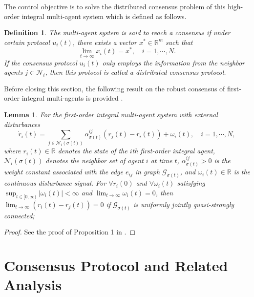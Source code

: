 \documentclass[12pt,draftcls,onecolumn]{IEEEtran}
\newtheorem{lem}{Lemma}
\newtheorem{Def}{Definition}
\begin{document}
The control objective is to solve the distributed consensus problem of this high-order integral multi-agent system which is defined as follows.
\begin{Def}\label{def1}
The multi-agent system is said to reach a consensus if under certain protocol $u_i(t)$, there exists a vector $x^*\in \mathbb{R}^m$ such that
\begin{displaymath}
\lim_{t\to\infty}x_i(t) = x^*,\quad i=1,\cdots,N.
\end{displaymath}
If the consensus protocol $u_i(t)$ only employs the information from the neighbor agents $j \in \mathcal{N}_i$, then this protocol is called a distributed consensus protocol.
\end{Def}

Before closing this section, the following result on the robust consensus of first-order integral multi-agents is provided \cite{Shi12arXiv}.
\begin{lem}\label{keylem}
For the first-order integral multi-agent system with external disturbances
\begin{equation}\label{equ:firstorder}
\dot{r}_i(t) = \sum_{j\in \mathcal{N}_i(\sigma(t))}\alpha^{ij}_{\sigma(t)}(r_j(t) - r_i(t)) + \omega_i(t), \quad i=1,\cdots,N,
\end{equation}
where $r_i(t) \in \mathbb{R}$ denotes the state of the $i$th first-order integral agent, $\mathcal{N}_i(\sigma(t))$ denotes the neighbor set of agent $i$ at time $t$, $\alpha^{ij}_{\sigma(t)} > 0$ is the weight constant associated with the edge $e_{ij}$ in graph $\mathcal{G}_{\sigma(t)}$, and $\omega_i(t) \in \mathbb{R}$ is the continuous disturbance signal. For $\forall r_i(0)$ and $\forall \omega_i(t)$ satisfying $\sup_{t\in[0,\infty)}|\omega_i(t)| < \infty$ and $\lim_{t\to\infty}\omega_i(t) = 0$, then $\lim_{t\to\infty} (r_i(t)-r_j(t)) = 0$ if $\mathcal{G}_{\sigma(t)}$ is uniformly jointly quasi-strongly connected;
\end{lem}
\begin{proof}
 See the proof of Proposition 1 in \cite{Shi12arXiv}.
 \end{proof}


\section{Consensus Protocol and Related Analysis}\label{continuous}
\end{document}
